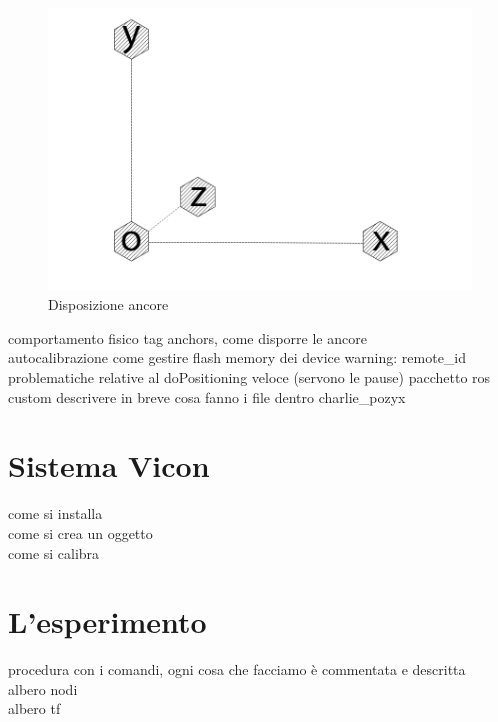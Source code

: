 \begin{figure}[h]
	\centering
	\includegraphics[height=0.2\textheight]{uwb_axis.png}
	\caption{Disposizione ancore}
	\label{fig: disposizione ancore}
\end{figure}
comportamento fisico
tag
anchors, come disporre le ancore \\
autocalibrazione
come gestire flash memory dei device
warning: remote\_id 
problematiche relative al doPositioning veloce (servono le pause)
pacchetto ros custom descrivere in breve cosa fanno i file dentro charlie\_pozyx

\section{Sistema Vicon}
\label{sez:Sistema Vicon}
come si installa \\
come si crea un oggetto\\
come si calibra

\section{L'esperimento}
\label{sez:L'esperimento}
procedura con i comandi, ogni cosa che facciamo \`e commentata e descritta \\
albero nodi\\
albero tf\\

